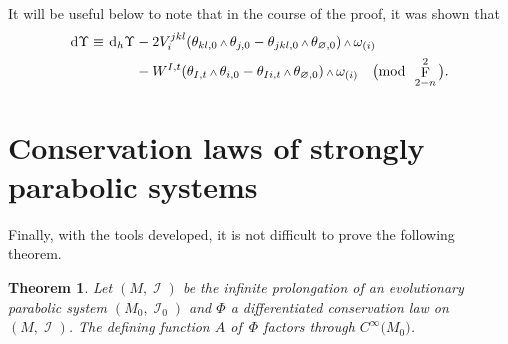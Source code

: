 \documentclass[pdftex]{sigma}
\DeclareMathOperator{\I}{\mathcal{I}}
\renewcommand{\d}{{\rm d}}
\newcommand{\cinfinity}[1]{C^\infty\big(#1\big)}
\renewcommand{\mod}[1]{\quad\big(\mathrm{mod\enspace} #1\big)}
\newcommand{\w}{{\mathchoice{\,{\scriptstyle\wedge}\,}{{\scriptstyle\wedge}}
 {{\scriptscriptstyle\wedge}}{{\scriptscriptstyle\wedge}}}}
\newcommand{\thetas}[1]{\theta_{#1}}
\newcommand{\thetanot}{\thetas{\varnothing,0}}
\newcommand{\omegas}[1]{\omega_{(#1)}}
\DeclareMathOperator{\pwf}{F}
\renewcommand{\dh}{\ensuremath{\hspace{1pt} \d_h}}
\numberwithin{equation}{section}
\newtheorem{Theorem}{Theorem}[section]
\begin{document}
\begin{Remark}\label{rmk: dvUpsilon}
 It will be useful below to note that in the course of the proof, it was shown that
 \begin{align*}
 \d\Upsilon \equiv \dh\Upsilon & - 2V_i^{jkl}(\thetas{kl,0}\w\thetas{j,0} - \thetas{jkl,0}\w\thetanot)\w\omegas{i} \\
 & - W^{I,t}(\thetas{I,t}\w\thetas{i,0} - \thetas{Ii,t}\w\thetanot)\w\omegas{i} \mod{\pwf^2_{2-n}}.
 \end{align*}
\end{Remark}

\section{Conservation laws of strongly parabolic systems}\label{sec:Conservation laws of strong parabolic}
Finally, with the tools developed, it is not difficult to prove the following theorem.
\begin{Theorem}\label{thm:Jacobi potential lives on M_0}
 Let $(M,\I)$ be the infinite prolongation of an evolutionary parabolic system $(M_0,\I_0)$ and
 $\Phi$ a differentiated conservation law on $(M,\I)$. The defining function $A$ of~$\Phi$ factors through $\cinfinity{M_0}$.
\end{Theorem}
\end{document}
